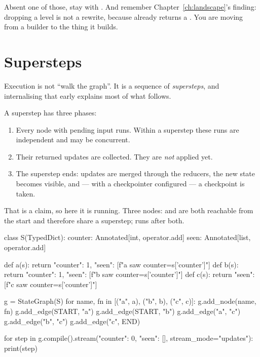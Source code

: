 Absent one of those, stay with . And remember
Chapter~\ref{ch:landscape}'s finding: dropping a level is not a rewrite, because
 already returns a . You are moving
from a builder to the thing it builds.

\section{Supersteps}
\label{sec:supersteps}

Execution is not ``walk the graph''. It is a sequence of \emph{supersteps}, and
internalising that early explains most of what follows.

A superstep has three phases:

\begin{enumerate}[leftmargin=1.4em]
\item Every node with pending input runs. Within a superstep these runs are
      independent and may be concurrent.
\item Their returned updates are collected. They are \emph{not} applied yet.
\item The superstep ends: updates are merged through the reducers, the new state
      becomes visible, and --- with a checkpointer configured --- a checkpoint is
      taken.
\end{enumerate}


That is a claim, so here it is running. Three nodes:  and  are
both reachable from the start and therefore share a superstep;  runs
after both.

\begin{python}[caption={Supersteps, observed}, label={lst:superstep}]
class S(TypedDict):
    counter: Annotated[int, operator.add]
    seen: Annotated[list, operator.add]


def a(s): return {"counter": 1, "seen": [f"a saw counter={s['counter']}"]}
def b(s): return {"counter": 1, "seen": [f"b saw counter={s['counter']}"]}
def c(s): return {"seen": [f"c saw counter={s['counter']}"]}


g = StateGraph(S)
for name, fn in [("a", a), ("b", b), ("c", c)]:
    g.add_node(name, fn)
g.add_edge(START, "a")
g.add_edge(START, "b")
g.add_edge("a", "c")
g.add_edge("b", "c")
g.add_edge("c", END)

for step in g.compile().stream({"counter": 0, "seen": []}, stream_mode="updates"):
    print(step)
\end{python}

